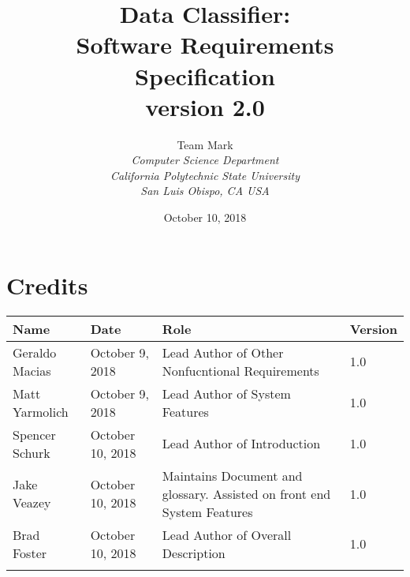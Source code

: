 \documentclass[12pt,oneside,letterpaper]{article}
\begin{document}
\title{\bfseries Data Classifier: \\
Software Requirements Specification\\
version 2.0}

\author {
\large{Team Mark}\\
\emph{Computer Science Department}\\
\emph{California Polytechnic State University}\\
\emph{San Luis Obispo, CA USA}\\
}

\date{October 10, 2018}
\maketitle \thispagestyle{empty}


\pagebreak
\tableofcontents



\section*{Credits}
\begin{tabular}{|l|l|p{2.5in}|l|}
\hline
\textbf{Name}&\textbf{Date}&\textbf{Role}&\textbf{Version}\\
\hline
Geraldo Macias&October 9, 2018&Lead Author of Other Nonfucntional Requirements&1.0\\
\hline
Matt Yarmolich&October 9, 2018&Lead Author of System Features&1.0\\
\hline
Spencer Schurk&October 10, 2018&Lead Author of Introduction&1.0\\
\hline
Jake Veazey&October 10, 2018&Maintains Document and glossary. Assisted on \gls{front end} System Features&1.0\\
\hline
Brad Foster&October 10, 2018&Lead Author of Overall Description&1.0\\
\hline
&&&\\
\hline
\end{tabular}
\end{document}

